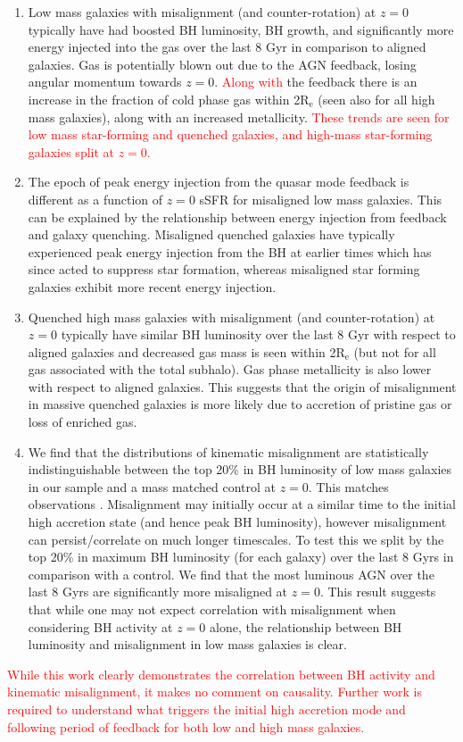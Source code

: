 \documentclass[fleqn,usenatbib]{mnras}
\newcommand{\red}[1]{{\textcolor{red}{#1}}}
\begin{document}
\begin{enumerate}
    \item Low mass galaxies with misalignment (and counter-rotation) at $z=0$ typically have had boosted BH luminosity, BH growth, and significantly more energy injected into the gas over the last 8 Gyr in comparison to aligned galaxies. Gas is potentially blown out due to the AGN feedback, losing angular momentum towards $z=0$. \red{Along with} the feedback there is an increase in the fraction of cold phase gas within 2$\mathrm{R_{e}}$ (seen also for all high mass galaxies), along with an increased metallicity. \red{These trends are seen for low mass star-forming and quenched galaxies, and high-mass star-forming galaxies split at $z=0$.}
    
    \item The epoch of peak energy injection from the quasar mode feedback is different as a function of $z=0$ sSFR for misaligned low mass galaxies. This can be explained by the relationship between energy injection from feedback and galaxy quenching. Misaligned quenched galaxies have typically experienced peak energy injection from the BH at earlier times which has since acted to suppress star formation, whereas misaligned star forming galaxies exhibit more recent energy injection.

    \item Quenched high mass galaxies with misalignment (and counter-rotation) at $z=0$ typically have similar BH luminosity over the last 8 Gyr with respect to aligned galaxies and decreased gas mass is  seen within 2$\mathrm{R_{e}}$ (but not for all gas associated with the total subhalo). Gas phase metallicity is also lower with respect to aligned galaxies. This suggests that the origin of misalignment in massive quenched galaxies is more likely due to accretion of pristine gas or loss of enriched gas. 
    
    \item We find that the distributions of kinematic misalignment are statistically indistinguishable between the top 20\% in BH luminosity of low mass galaxies in our sample and a mass matched control at $z=0$. This matches observations \citep[see Figure 6 in][]{ilha2019}. Misalignment may initially occur at a similar time to the initial high accretion state (and hence peak BH luminosity), however misalignment can persist/correlate on much longer timescales. To test this we split by the top 20\% in maximum BH luminosity (for each galaxy) over the last 8 Gyrs in comparison with a control. We find that the most luminous AGN over the last 8 Gyrs are significantly more misaligned at $z=0$. This result suggests that while one may not expect correlation with misalignment when considering BH activity at $z=0$ alone, the relationship between BH luminosity and misalignment in low mass galaxies is clear. 
\end{enumerate}
\red{While this work clearly demonstrates the correlation between BH activity and kinematic misalignment, it makes no comment on causality. Further work is required to understand what triggers the initial high accretion mode and following period of feedback for both low and high mass galaxies.}
\end{document}
